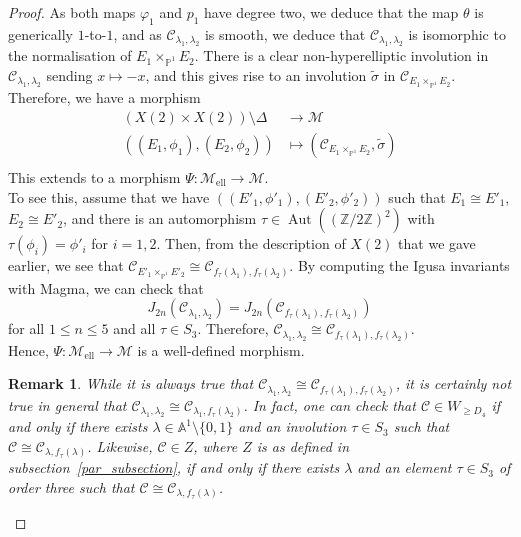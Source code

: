 \documentclass[10pt,a4paper]{amsart}
\newtheorem{remark}{Remark}
\DeclareMathOperator{\Aut}{Aut}
\newcommand{\calC}{\mathcal{C}}
\newcommand{\calM}{\mathcal{M}}
\newcommand{\mell}{\mathcal{M}_{\text{ell}}}
\newcommand{\nor}{\calC_{E_1 \times_{\mathbb{P}^1} E_2}}
\begin{document}
\begin{proof}
As both maps $\varphi_1$ and $p_1$ have degree two, we deduce that the map $\theta$ is generically $1$-to-$1$, and as $\calC_{\lambda_1,\lambda_2}$ is smooth, we deduce that $\calC_{\lambda_1,\lambda_2}$ is isomorphic to the normalisation of $E_1\times_{\mathbb{P}^1}E_2$. There is a clear non-hyperelliptic involution
in $\calC_{\lambda_1,\lambda_2}$ sending $x\mapsto -x$, and this gives rise to an involution $\tilde{\sigma}$ in $\nor$.
Therefore, we have a morphism
\begin{align*}
(X(2)\times X(2))\setminus\Delta&\longrightarrow\calM\\
((E_1,\phi_1),(E_2,\phi_2))&\longmapsto(\nor,\tilde{\sigma})\\
\end{align*}
This extends to a morphism $\Psi:\mell\rightarrow\calM$.\\

To see this, assume that we have $((E'_1, \phi'_1), (E'_2, \phi'_2))$ such that $E_1 \cong E'_1$, $E_2 \cong E'_2$, and there is an automorphism $\tau \in \Aut((\mathbb{Z}/2\mathbb{Z})^2)$ with $\tau(\phi_i) = \phi'_i$ for $i = 1, 2$.  
Then, from the description of $X(2)$ that we gave earlier, we see that $\mathcal{C}_{E'_1 \times_{\mathbb{P}^1} E'_2} \cong \mathcal{C}_{f_\tau(\lambda_1), f_\tau(\lambda_2)}$.  
By computing the Igusa invariants with Magma, we can check that 
\[
J_{2n}(\mathcal{C}_{\lambda_1, \lambda_2}) = J_{2n}(\mathcal{C}_{f_\tau(\lambda_1), f_\tau(\lambda_2)})
\]
for all $1 \leq n \leq 5$ and all $\tau \in S_3$. Therefore, $\mathcal{C}_{\lambda_1, \lambda_2} \cong \mathcal{C}_{f_\tau(\lambda_1), f_\tau(\lambda_2)}$.\\

Hence, $\Psi: \mathcal{M}_{\mathrm{ell}} \to \mathcal{M}$ is a well-defined morphism.

\begin{remark}
While it is always true that $\mathcal{C}_{\lambda_1, \lambda_2} \cong \mathcal{C}_{f_\tau(\lambda_1), f_\tau(\lambda_2)}$, it is certainly not true in general that $\mathcal{C}_{\lambda_1, \lambda_2} \cong \mathcal{C}_{\lambda_1, f_\tau(\lambda_2)}$.  
In fact, one can check that $\mathcal{C} \in W_{\geq D_4}$ if and only if there exists $\lambda \in \mathbb{A}^1 \setminus \{0,1\}$ and an involution $\tau \in S_3$ such that $\mathcal{C} \cong \mathcal{C}_{\lambda, f_\tau(\lambda)}$.  
Likewise, $\mathcal{C} \in Z$, where $Z$ is as defined in subsection~\ref{par_subsection}, if and only if there exists $\lambda$ and an element $\tau \in S_3$ of order three such that $\mathcal{C} \cong \mathcal{C}_{\lambda, f_\tau(\lambda)}$.\\
\end{remark}
\newpage


\end{proof}
\end{document}
